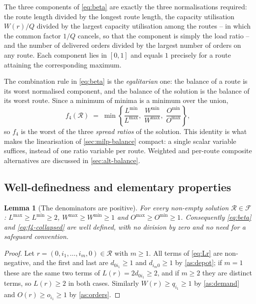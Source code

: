 \documentclass[11pt,a4paper]{article}
\theoremstyle{definition}
\theoremstyle{plain}
\newtheorem{lemma}[definition]{Lemma}
\newcommand{\Feas}{\mathcal{F}}
\newcommand{\Routes}{\mathcal{R}}
\newcommand{\Lmax}{L^{\max}}
\newcommand{\Wmax}{W^{\max}}
\newcommand{\Omax}{O^{\max}}
\begin{document}
The three components of \eqref{eq:beta} are exactly the three normalisations
required: the route length divided by the longest route length, the capacity
utilisation $W(r)/Q$ divided by the largest capacity utilisation among the
routes -- in which the common factor $1/Q$ cancels, so that the component is
simply the load ratio -- and the number of delivered orders divided by the
largest number of orders on any route.  Each component lies in $[0,1]$ and
equals $1$ precisely for a route attaining the corresponding maximum.

The combination rule in \eqref{eq:beta} is the \emph{egalitarian} one: the
balance of a route is its worst normalised component, and the balance of the
solution is the balance of its worst route.  Since a minimum of minima is a
minimum over the union,
\begin{equation}
  f_4(\Routes)
  \;=\;
  \min\left\{
    \frac{L^{\min}}{\Lmax}, \;
    \frac{W^{\min}}{\Wmax}, \;
    \frac{O^{\min}}{\Omax}
  \right\},
  \label{eq:f4-collapsed}
\end{equation}
so $f_4$ is the worst of the three \emph{spread ratios} of the solution.  This
identity is what makes the linearisation of \cref{sec:milp-balance} compact: a
single scalar variable suffices, instead of one ratio variable per route.
Weighted and per-route composite alternatives are discussed in
\cref{sec:alt-balance}.

\subsection{Well-definedness and elementary properties}

\begin{lemma}[The denominators are positive]
\label{lem:welldef}
For every non-empty solution $\Routes \in \Feas$:
$\Lmax \ge L^{\min} \ge 2$, $\Wmax \ge W^{\min} \ge 1$ and
$\Omax \ge O^{\min} \ge 1$.  Consequently \eqref{eq:beta} and
\eqref{eq:f4-collapsed} are well defined, with no division by zero and no need
for a safeguard convention.
\end{lemma}

\begin{proof}
Let $r = (0,i_1,\dots,i_m,0) \in \Routes$ with $m \ge 1$.  All terms of
\eqref{eq:Lr} are non-negative, and the first and last are $d_{0 i_1} \ge 1$
and $d_{i_m 0} \ge 1$ by \cref{as:depot}; if $m = 1$ these are the same two
terms of $L(r) = 2 d_{0 i_1} \ge 2$, and if $m \ge 2$ they are distinct terms,
so $L(r) \ge 2$ in both cases.  Similarly $W(r) \ge q_{i_1} \ge 1$ by
\cref{as:demand} and $O(r) \ge o_{i_1} \ge 1$ by \cref{as:orders}.
\end{proof}
\end{document}
